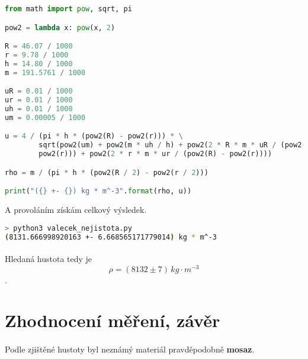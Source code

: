 \documentclass[a4paper,11pt]{article}
\begin{document}
    \begin{lstlisting}[language=Python]
from math import pow, sqrt, pi

pow2 = lambda x: pow(x, 2)

R = 46.07 / 1000
r = 9.78 / 1000
h = 14.80 / 1000
m = 191.5761 / 1000

uR = 0.01 / 1000
ur = 0.01 / 1000
uh = 0.01 / 1000
um = 0.00005 / 1000

u = 4 / (pi * h * (pow2(R) - pow2(r))) * \
        sqrt(pow2(um) + pow2(m * uh / h) + pow2(2 * R * m * uR / (pow2(R) - \
        pow2(r))) + pow2(2 * r * m * ur / (pow2(R) - pow2(r))))

rho = m / (pi * h * (pow2(R / 2) - pow2(r / 2)))

print("({} +- {}) kg * m^-3".format(rho, u)) \end{lstlisting}

    A provoláním získám celkový výsledek.

    \begin{lstlisting}[language=Bash]
> python3 valecek_nejistota.py
(8131.666998920163 +- 6.668565171779014) kg * m^-3 \end{lstlisting}

    \paragraph{} Hledaná hustota tedy je
    $$\rho = \left(8132 \pm 7 \right)\,kg \cdot m^{-3}$$.

\section{Zhodnocení měření, závěr}

    \paragraph{} Podle zjištěné hustoty byl neznámý materiál 
    pravděpodobně \textbf{mosaz}.
\end{document}
